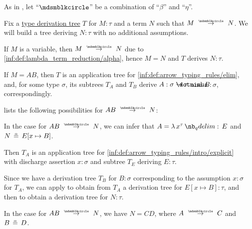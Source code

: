 \begin{proposition}\label{thm:}

\end{proposition}

\begin{algorithm}\label{alg:simply_typed_reduction}
  As in , let \enquote{\( {\Anon} \)} be a combination of \enquote{\( \beta \)} and \enquote{\( \eta \)}.

  Fix a \hyperref[def:type_derivation_tree]{type derivation tree} \( T \) for \( M: \tau \) and a term \( N \) such that \( M \pred N \). We will build a tree deriving \( N: \tau \) with no additional assumptions.

  \begin{thmenum}
     If \( M \) is a variable, then \( M \pred N \) due to \ref{inf:def:lambda_term_reduction/alpha}, hence \( M = N \) and \( T \) derives \( N: \tau \).

     If \( M = AB \), then \( T \) is an application tree for \ref{inf:def:arrow_typing_rules/elim}, and, for some type \( \sigma \), its subtrees \( T_A \) and \( T_B \) derive \( A: \sigma \synimplies \tau \) and \( B: \sigma \), correspondingly.

     lists the following possibilities for \( A B \pred N \):
    \begin{thmenum}
       In the case  for \( A B \pred N \), we can infer that \( A = \qabs {x^\tau} E \) and \( N \aequiv E[x \mapsto B] \).

      Then \( T_A \) is an application tree for \ref{inf:def:arrow_typing_rules/intro/explicit} with discharge assertion \( x: \sigma \) and subtree \( T_E \) deriving \( E: \tau \).

      Since we have a derivation tree \( T_B \) for \( B: \sigma \) corresponding to the assumption \( x: \sigma \) for \( T_A \), we can apply  to obtain from \( T_A \) a derivation tree for \( E[x \mapsto B]: \tau \), and then  to obtain a derivation tree for \( N: \tau \).

       In the case  for \( A B \pred N \), we have \( N = CD \), where \( A \pred C \) and \( B \aequiv D \).


\end{thmenum}
\end{thmenum}
\end{algorithm}
